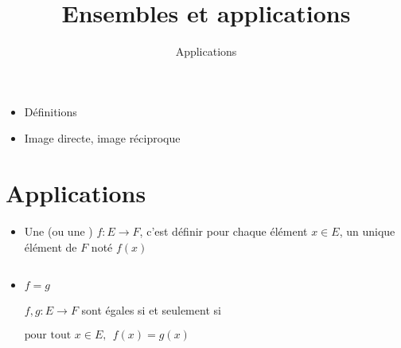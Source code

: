 







\title{{\bf Ensembles et applications}}
\subtitle{Applications}


\begin{frame}
  
  \debutmontitre

  \pause

{\footnotesize
\hfill
{}
\begin{minipage}{0.6\textwidth}
  \begin{itemize}
    \item<3-> Définitions
    \item<4-> Image directe, image réciproque 
  \end{itemize}
\end{minipage}
}

\end{frame}

\setcounter{framenumber}{0}


\section{Applications}

\begin{frame}
\begin{itemize}
  \item Une  (ou une ) $f : E \to F$,
c'est définir pour chaque élément $x \in E$, un unique élément de $F$ noté $f(x)$
\pause
\begin{columns}
\column{3cm} %
\column{5cm}
\pause
\column{5cm}
\end{columns}
  
\pause

  \item {} $f=g$  

$f,g : E \to F$ sont égales si et seulement si 

\qquad $\text{pour tout } x \in E,\ \  f(x)=g(x)$
\end{itemize}

\end{frame}

